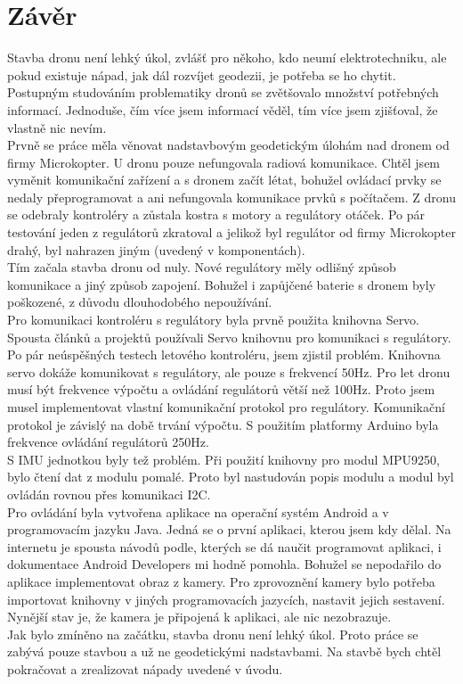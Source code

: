 \chapter{Závěr}
\label{8-zaver}
Stavba dronu není lehký úkol, zvlášť pro někoho, kdo neumí elektrotechniku, ale pokud existuje nápad, jak dál rozvíjet geodezii, je potřeba se ho chytit. Postupným studováním problematiky dronů se zvětšovalo množství potřebných informací. Jednoduše, čím více jsem informací věděl, tím více jsem zjišťoval, že vlastně nic nevím.\\
Prvně se práce měla věnovat nadstavbovým geodetickým úlohám nad dronem od firmy Microkopter. U dronu pouze nefungovala radiová komunikace. Chtěl jsem vyměnit komunikační zařízení a s dronem začít létat, bohužel ovládací prvky se nedaly přeprogramovat a ani nefungovala komunikace prvků s počítačem. Z dronu se odebraly kontroléry a zůstala kostra s motory a regulátory otáček. Po pár testování jeden z regulátorů zkratoval a jelikož byl regulátor od firmy Microkopter drahý, byl nahrazen jiným (uvedený v komponentách).\\
Tím začala stavba dronu od nuly. Nové regulátory měly odlišný způsob komunikace a jiný způsob zapojení. Bohužel i zapůjčené baterie s dronem byly poškozené, z důvodu dlouhodobého nepoužívání.\\
Pro komunikaci kontroléru s regulátory byla prvně použita knihovna Servo. Spousta článků a projektů používali Servo knihovnu pro komunikaci  s regulátory. Po pár neúspěšných testech letového kontroléru, jsem zjistil problém. Knihovna servo dokáže komunikovat s regulátory, ale pouze s frekvencí 50Hz. Pro let dronu musí být frekvence výpočtu a ovládání regulátorů větší než 100Hz. Proto jsem musel implementovat vlastní komunikační protokol pro regulátory. Komunikační protokol je závislý na době trvání výpočtu. S použitím platformy Arduino byla frekvence ovládání regulátorů 250Hz.\\
S IMU jednotkou byly tež problém. Při použití knihovny pro modul MPU9250, bylo čtení dat z modulu pomalé. Proto byl nastudován popis modulu a modul byl ovládán rovnou přes komunikaci I2C.\\
Pro ovládání byla vytvořena aplikace na operační systém Android a v programovacím jazyku Java. Jedná se o první aplikaci, kterou jsem kdy dělal. Na internetu je spousta návodů podle, kterých se dá naučit programovat aplikaci, i dokumentace Android Developers mi hodně pomohla. Bohužel se nepodařilo do aplikace implementovat obraz z kamery. Pro zprovoznění kamery bylo potřeba importovat knihovny v jiných programovacích jazycích, nastavit jejich sestavení. Nynější stav je, že kamera je připojená k aplikaci, ale nic nezobrazuje.\\
Jak bylo zmíněno na začátku, stavba dronu není lehký úkol. Proto práce se zabývá pouze stavbou a už ne geodetickými nadstavbami. Na stavbě bych chtěl pokračovat a zrealizovat nápady uvedené v úvodu.\\
